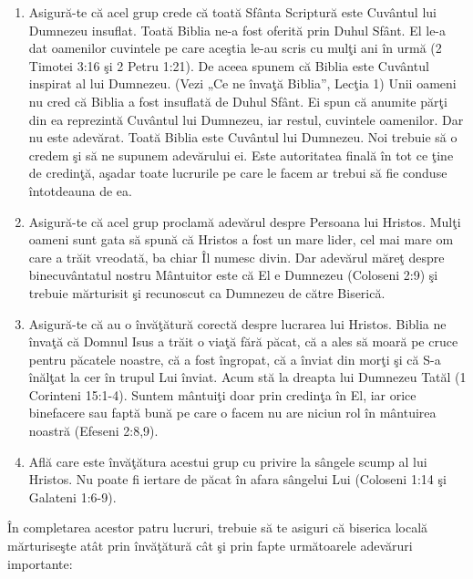 \begin{enumerate}

	\item Asigură-te că acel grup crede că toată Sfânta Scriptură este Cuvântul lui Dumnezeu insuflat. Toată Biblia ne-a fost oferită prin Duhul Sfânt. El le-a dat oamenilor cuvintele pe care aceştia le-au scris cu mulţi ani în urmă (2 Timotei 3:16 şi 2 Petru 1:21). De aceea spunem că Biblia este Cuvântul inspirat al lui Dumnezeu. (Vezi „Ce ne învaţă Biblia”, Lecţia 1) Unii oameni nu cred că Biblia a fost insuflată de Duhul Sfânt. Ei spun că anumite părţi din ea reprezintă Cuvântul lui Dumnezeu, iar restul, cuvintele oamenilor. Dar nu este adevărat. Toată Biblia este Cuvântul lui Dumnezeu. Noi trebuie să o credem şi să ne supunem adevărului ei. Este autoritatea finală în tot ce ţine de credinţă, aşadar toate lucrurile pe care le facem ar trebui să fie conduse întotdeauna de ea.
	
	\item Asigură-te că acel grup proclamă adevărul despre Persoana lui Hristos. Mulţi oameni sunt gata să spună că Hristos a fost un mare lider, cel mai mare om care a trăit vreodată, ba chiar Îl numesc divin. Dar adevărul măreţ despre binecuvântatul nostru Mântuitor este că El e Dumnezeu (Coloseni 2:9) şi trebuie mărturisit şi recunoscut ca Dumnezeu de către Biserică.
	
	\item Asigură-te că au o învăţătură corectă despre lucrarea lui Hristos. Biblia ne învaţă că Domnul Isus a trăit o viaţă fără păcat, că a ales să moară pe cruce pentru păcatele noastre, că a fost îngropat, că a înviat din morţi şi că S-a înălţat la cer în trupul Lui înviat. Acum stă la dreapta lui Dumnezeu Tatăl (1 Corinteni 15:1-4). Suntem mântuiţi doar prin credinţa în El, iar orice binefacere sau faptă bună pe care o facem nu are niciun rol în mântuirea noastră (Efeseni 2:8,9).
	
	\item Află care este învăţătura acestui grup cu privire la sângele scump al lui Hristos. Nu poate fi iertare de păcat în afara sângelui Lui (Coloseni 1:14 şi Galateni 1:6-9).
	
\end{enumerate}

În completarea acestor patru lucruri, trebuie să te asiguri că biserica locală mărturiseşte atât prin învăţătură cât şi prin fapte următoarele adevăruri importante:


